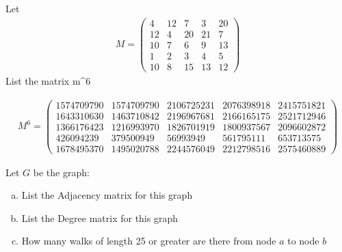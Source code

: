 \documentclass[10pt,letterpaper, cm]{hmcpset}
\begin{document}
  \begin{problem}[13]
    Let
    \begin{align*}
      M = \begin{pmatrix}
        4 & 12 & 7 & 3 & 20 \\
        12 & 4 & 20 & 21 & 7  \\
        10 & 7 & 6 & 9 & 13 \\
        1 & 2 & 3 & 4 & 5 \\
        10 & 8 & 15 & 13 & 12
      \end{pmatrix}
    \end{align*}
    List the matrix m^6
  \end{problem}
    
  \begin{align*}
      M^6 = \begin{pmatrix}
        1574709790 &  1574709790 & 2106725231 & 2076398918 & 2415751821 \\
        1643310630 & 1463710842 & 2196967681 & 2166165175 & 2521712946  \\
        1366176423 & 1216993970 & 1826701919 & 1800937567 & 2096602872 \\
        426094239  & 379500949  & 56993949 & 561795111 & 653713575 \\
        1678495370 & 1495020788 & 2244576049 & 2212798516 & 2575460889
      \end{pmatrix}
    \end{align*}

\begin{problem}[14]
    Let $G$ be the graph:
    \begin{center}
    \end{center}

    \begin{enumerate}[(a)]
        \item List the Adjacency matrix for this graph
        \item List the Degree matrix for this graph
        \item How many walks of length 25 or greater are there from node $a$ to node $b$
    \end{enumerate}
\end{problem}
    
\end{document}
